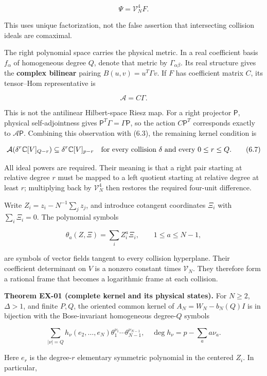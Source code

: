 \documentclass[a4paper,11pt]{article}
\numberwithin{equation}{section}
\begin{document}
\[
\Psi=\mathcal V_N^4F.
\tag{6.5}
\]

This uses unique factorization, not the false assertion that intersecting collision ideals are comaximal.

The right polynomial space carries the physical metric. In a real coefficient basis \(f_\alpha\) of homogeneous degree \(Q\), denote that metric by \(\Gamma_{\alpha\beta}\). Its real structure gives the \textbf{complex bilinear} pairing \(B(u,v)=u^T\Gamma v\). If \(F\) has coefficient matrix \(C\), its tensor--Hom representative is

\[
\mathcal A=C\Gamma.
\tag{6.6}
\]

This is not the antilinear Hilbert-space Riesz map. For a right projector \(\mathsf P\), physical self-adjointness gives \(\mathsf P^T\Gamma=\Gamma\mathsf P\), so the action \(C\mathsf P^T\) corresponds exactly to \(\mathcal A\mathsf P\). Combining this observation with (6.3), the remaining kernel condition is

\[
\mathcal A\!\left(\delta^r\mathbb C[V]_{Q-r}\right)
\subseteq\delta^r\mathbb C[V]_{p-r}
\quad\hbox{for every collision }\delta
\hbox{ and every }0\le r\le Q.
\tag{6.7}
\]

All ideal powers are required. Their meaning is that a right pair starting at relative degree \(r\) must be mapped to a left quotient starting at relative degree at least \(r\); multiplying back by \(\mathcal V_N^4\) then restores the required four-unit difference.

Write \(Z_i=z_i-N^{-1}\sum_jz_j\), and introduce cotangent coordinates \(\Xi_i\) with \(\sum_i\Xi_i=0\). The polynomial symbols

\[
\theta_a(Z,\Xi)=\sum_i Z_i^a\Xi_i,
\qquad 1\le a\le N-1,
\tag{6.8}
\]

are symbols of vector fields tangent to every collision hyperplane. Their coefficient determinant on \(V\) is a nonzero constant times \(\mathcal V_N\). They therefore form a rational frame that becomes a logarithmic frame at each collision.

\textbf{Theorem EX-01 (complete kernel and its physical states).} For \(N\ge2\), \(\Delta>1\), and finite \(P,Q\), the oriented common kernel of \(A_N=W_N-b_N(Q)I\) is in bijection with the Bose-invariant homogeneous degree-\(Q\) symbols

\[
\sum_{|\nu|=Q}h_\nu(e_2,\ldots,e_N)\theta_1^{\nu_1}\cdots\theta_{N-1}^{\nu_{N-1}},
\quad
\deg h_\nu=p-\sum_a a\nu_a.
\tag{6.9}
\]

Here \(e_r\) is the degree-\(r\) elementary symmetric polynomial in the centered \(Z_i\). In particular,
\end{document}
